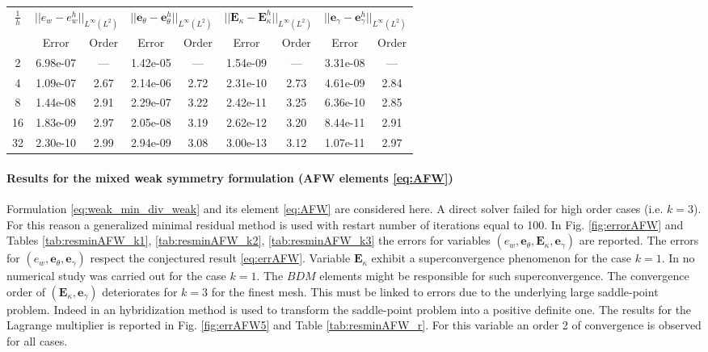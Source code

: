 \begin{table}[hp]
	\centering
	\begin{tabular}{ccccccccc}
		\hline 
		\multirow{2}{*}{$\frac{1}{h}$} & \multicolumn{2}{c}{$||e_w - e_w^h||_{L^{\infty}(L^2)}$}    & \multicolumn{2}{c}{$||\bm{e}_\theta - \bm{e}_\theta^h||_{L^{\infty}(L^2)}$} & \multicolumn{2}{c}{$||\bm{E}_\kappa - \bm{E}_\kappa^h||_{L^{\infty}(L^2)}$} & \multicolumn{2}{c}{$||\bm{e}_\gamma - \bm{e}_\gamma^ h||_{L^{\infty}(L^2)}$}   \\ 
		& Error & Order  & Error & Order  & Error & Order  & Error & Order   \\ 
		\hline 
		2  & 6.98e-07 & ---  & 1.42e-05 & ---  & 1.54e-09 & ---  & 3.31e-08 & --- \\ 
		4  & 1.09e-07 & 2.67 & 2.14e-06 & 2.72 & 2.31e-10 & 2.73 & 4.61e-09 & 2.84\\ 
		8  & 1.44e-08 & 2.91 & 2.29e-07 & 3.22 & 2.42e-11 & 3.25 & 6.36e-10 & 2.85\\ 
		16 & 1.83e-09 & 2.97 & 2.05e-08 & 3.19 & 2.62e-12 & 3.20 & 8.44e-11 & 2.91\\ 
		32 & 2.30e-10 & 2.99 & 2.94e-09 & 3.08 & 3.00e-13 & 3.12 & 1.07e-11 & 2.97\\ 
		\hline 
	\end{tabular} 
	\captionsetup{width=0.95\linewidth}
	\vspace{1mm}
	\label{tab:resminBTJ_k3}
\end{table}

\paragraph{Results for the mixed weak symmetry formulation (AFW elements \eqref{eq:AFW})} 
Formulation \eqref{eq:weak_min_div_weak} and its element \eqref{eq:AFW} are considered here. A direct solver failed for high order cases (i.e. $k=3$). For this reason a generalized minimal residual method is used with restart number of iterations equal to 100. In Fig. \ref{fig:errorAFW} and Tables \ref{tab:resminAFW_k1}, \ref{tab:resminAFW_k2}, \ref{tab:resminAFW_k3} the errors for variables $(e_w, \bm{e}_\theta, \bm{E}_\kappa, \bm{e}_\gamma)$  are reported. The errors for $(e_w, \bm{e}_\theta, \bm{e}_\gamma)$ respect the conjectured result \eqref{eq:errAFW}. Variable $\bm{E}_\kappa$ exhibit a superconvergence phenomenon for the case $k=1$. In \cite{arnold2014elastodynamics} no numerical study was carried out for the case $k=1$. The $BDM$ elements might be responsible for such superconvergence. The convergence order of $(\bm{E}_\kappa, \bm{e}_\gamma)$ deteriorates for $k=3$ for the finest mesh. This must be linked to errors due to the underlying large saddle-point problem. Indeed in \cite{arnold2014elastodynamics} an hybridization method is used to transform the saddle-point problem into a positive definite one. The results for the Lagrange multiplier is reported in Fig. \ref{fig:errAFW5} and Table \ref{tab:resminAFW_r}. For this variable an order 2 of convergence is observed for all cases.

